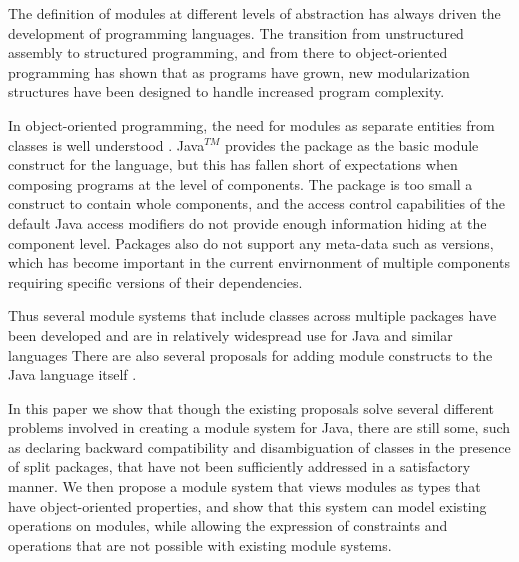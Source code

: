 The definition of modules at different levels of abstraction
has always driven the development of programming languages.
The transition from unstructured assembly to structured programming,
and from there to object-oriented programming has shown that
as programs have grown, new modularization structures have
been designed to handle increased program complexity.

In object-oriented programming, the need for modules as separate
entities from classes is well understood \cite{szyperski92import}.
Java$^{TM}$ provides the package as the basic module construct for the language, but
this has fallen short of expectations when composing programs at
the level of components. The package is too small a construct
to contain whole components, and the access control capabilities
of the default Java access modifiers do not provide enough
information hiding at the component level. Packages also do not
support any meta-data such as versions, which has become important
in the current envirnonment of multiple components requiring
specific versions of their dependencies.

Thus several module systems that include classes across multiple 
packages have been developed and are in relatively widespread use 
for Java and similar languages \cite{OSGi4, netassemblies} There are also several
proposals for adding module constructs to the Java language itself
\cite{JSR294, JSR277}.

In this paper we show that though the existing proposals solve
several different problems involved in creating a module system
for Java, there are still some, such as declaring backward
compatibility and disambiguation of classes in the presence of
split packages, that have not been sufficiently addressed in a
satisfactory manner. We then propose a module system that
views modules as types that have object-oriented properties,
and show that this system can model existing operations on modules,
while allowing the expression of constraints and operations that
are not possible with existing module systems.